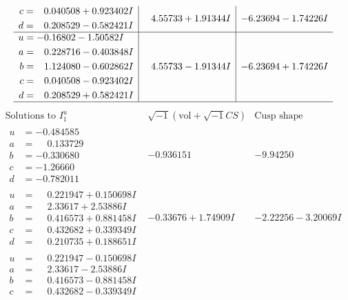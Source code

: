 \documentclass[1p]{elsarticle_modified}
\theoremstyle{definition}
\newcommand{\I}{\sqrt{-1}}
\begin{document}
$$\begin{array}{c|c|c}
\begin{aligned}
c &= \phantom{-}0.040508 + 0.923402 I \\
d &= \phantom{-}0.208529 - 0.582421 I\end{aligned}
 & \phantom{-}4.55733 + 1.91344 I & -6.23694 - 1.74226 I \\ \hline\begin{aligned}
u &= -0.16802 - 1.50582 I \\
a &= \phantom{-}0.228716 - 0.403848 I \\
b &= \phantom{-}1.124080 - 0.602862 I \\
c &= \phantom{-}0.040508 - 0.923402 I \\
d &= \phantom{-}0.208529 + 0.582421 I\end{aligned}
 & \phantom{-}4.55733 - 1.91344 I & -6.23694 + 1.74226 I\\
 \hline 
 \end{array}$$\newpage$$\begin{array}{c|c|c}  
\text{Solutions to }I^u_{1}& \I (\text{vol} + \sqrt{-1}CS) & \text{Cusp shape}\\
 \hline 
\begin{aligned}
u &= -0.484585\phantom{ +0.000000I} \\
a &= \phantom{-}0.133729\phantom{ +0.000000I} \\
b &= -0.330680\phantom{ +0.000000I} \\
c &= -1.26660\phantom{ +0.000000I} \\
d &= -0.782011\phantom{ +0.000000I}\end{aligned}
 & -0.936151\phantom{ +0.000000I} & -9.94250\phantom{ +0.000000I} \\ \hline\begin{aligned}
u &= \phantom{-}0.221947 + 0.150698 I \\
a &= \phantom{-}2.33617 + 2.53886 I \\
b &= \phantom{-}0.416573 + 0.881458 I \\
c &= \phantom{-}0.432682 + 0.339349 I \\
d &= \phantom{-}0.210735 + 0.188651 I\end{aligned}
 & -0.33676 + 1.74909 I & -2.22256 - 3.20069 I \\ \hline\begin{aligned}
u &= \phantom{-}0.221947 - 0.150698 I \\
a &= \phantom{-}2.33617 - 2.53886 I \\
b &= \phantom{-}0.416573 - 0.881458 I \\
c &= \phantom{-}0.432682 - 0.339349 I \\

\end{aligned}
\end{array}$$
\end{document}

